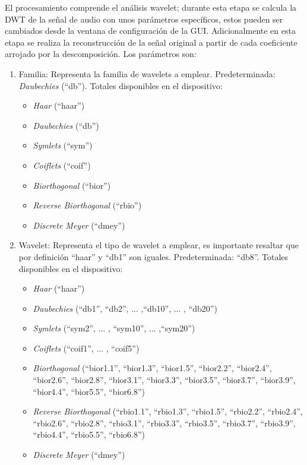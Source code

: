 \documentclass[11pt,lettersize]{article} %
\begin{document}
El procesamiento comprende el análisis wavelet; durante esta etapa se calcula la DWT de la señal de audio con unos parámetros específicos, estos pueden ser cambiados desde la ventana de configuración de la GUI. Adicionalmente en esta etapa se realiza la reconstrucción de la señal original a partir de cada coeficiente arrojado por la descomposición. Los parámetros son:
\begin{enumerate}
	\item Familia: Representa la familia de wavelets a emplear. Predeterminada: \textit{Daubechies} (``db''). Totales disponibles en el dispositivo:
	\begin{itemize}[nolistsep]
		\item \textit{Haar} (``haar'')
		\item \textit{Daubechies} (``db'')
		\item \textit{Symlets} (``sym'')
		\item \textit{Coiflets} (``coif'')
		\item \textit{Biorthogonal} (``bior'')
		\item \textit{Reverse Biorthogonal} (``rbio'')
		\item \textit{Discrete Meyer} (``dmey'')
	\end{itemize}

	\item Wavelet: Representa el tipo de wavelet a emplear, es importante resaltar que por definición ``haar'' y ``db1'' son iguales. Predeterminada: ``db8''. Totales disponibles en el dispositivo:
	\begin{itemize}
		\item \textit{Haar} (``haar'')
		\item \textit{Daubechies} (``db1'', ``db2'', ... ,``db10'', ... , ``db20'')
		\item \textit{Symlets} (``sym2'', ... , ``sym10'', ... ,``sym20'')
		\item \textit{Coiflets} (``coif1'', ... , ``coif5'')
		\item \textit{Biorthogonal} (``bior1.1'', ``bior1.3'', ``bior1.5'', ``bior2.2'', ``bior2.4'', ``bior2.6'', ``bior2.8'', ``bior3.1'', ``bior3.3'', ``bior3.5'', ``bior3.7'', ``bior3.9'', ``bior4.4'', ``bior5.5'', ``bior6.8'')
		\item \textit{Reverse Biorthogonal} (``rbio1.1'', ``rbio1.3'', ``rbio1.5'', ``rbio2.2'', ``rbio2.4'', ``rbio2.6'', ``rbio2.8'', ``rbio3.1'', ``rbio3.3'', ``rbio3.5'', ``rbio3.7'', ``rbio3.9'', ``rbio4.4'', ``rbio5.5'', ``rbio6.8'')
		\item \textit{Discrete Meyer} (``dmey'')
	\end{itemize}


\end{enumerate}
\end{document}
